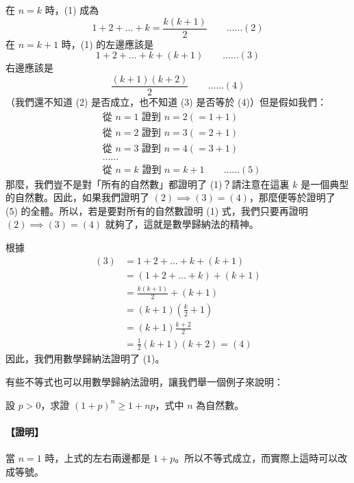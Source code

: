 在 $n=k$ 時，(1) 成為
\begin{equation}\label{eq:ind_step_k}
  1+2+\dots+k = \frac{k(k+1)}{2} \qquad \dots\dots (2)
\end{equation}
在 $n=k+1$ 時，(1) 的左邊應該是
\begin{equation}\label{eq:ind_step_lhs}
  1+2+\dots+k+(k+1) \qquad \dots\dots (3)
\end{equation}
右邊應該是
\begin{equation}\label{eq:ind_step_rhs}
  \frac{(k+1)(k+2)}{2} \qquad \dots\dots (4)
\end{equation}
（我們還不知道 (2) 是否成立，也不知道 (3) 是否等於 (4)）但是假如我們：
\begin{align*}
  &\text{從 } n=1 \text{ 證到 } n=2 (=1+1) \\
  &\text{從 } n=2 \text{ 證到 } n=3 (=2+1) \\
  &\text{從 } n=3 \text{ 證到 } n=4 (=3+1) \\
  &\dots\dots \\
  &\text{從 } n=k \text{ 證到 } n=k+1 \qquad \dots\dots (5)
\end{align*}
那麼，我們豈不是對「所有的自然數」都證明了 (1)？請注意在這裏 $k$ 是一個典型的自然數。因此，如果我們證明了 $(2) \implies (3)=(4)$，那麼便等於證明了 (5) 的全體。所以，若是要對所有的自然數證明 (1) 式，我們只要再證明 $(2) \implies (3)=(4)$ 就夠了，這就是數學歸納法的精神。

根據
\begin{align*}
  (3) &= 1 + 2 + \dots + k + (k+1) \\
  &= (1 + 2 + \dots + k) + (k+1) \\
  &= \frac{k(k+1)}{2} + (k+1) \\
  &= (k+1)\left(\frac{k}{2} + 1\right) \\
  &= (k+1)\frac{k+2}{2} \\
  &= \frac{1}{2}(k+1)(k+2) = (4)
\end{align*}
因此，我們用數學歸納法證明了 (1)。

有些不等式也可以用數學歸納法證明，讓我們舉一個例子來說明：

\begin{example}\label{ex:b1-3-2}
設 $p > 0$，求證 $(1+p)^n \ge 1+np$，式中 $n$ 為自然數。
\end{example}

\paragraph{【證明】}當 $n=1$ 時，上式的左右兩邊都是 $1+p$。所以不等式成立，而實際上這時可以改成等號。

